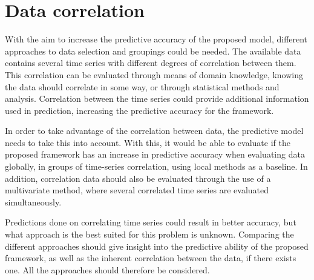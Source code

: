 \section{Data correlation}
\label{section:Architecture:ModelStructure}

With the aim to increase the predictive accuracy of the proposed model,
different approaches to data selection and groupings could be needed.
The available data contains several time series with different degrees of correlation between them.
This correlation can be evaluated through means of domain knowledge,
knowing the data should correlate in some way, or through statistical methods and analysis.
Correlation between the time series could provide additional information used in prediction,
increasing the predictive accuracy for the framework.


In order to take advantage of the correlation between data,
the predictive model needs to take this into account.
With this, it would be able to evaluate if the proposed framework has an increase in predictive accuracy
when evaluating data globally, in groups of time-series correlation, using local methods as a baseline.
In addition, correlation data should also be evaluated through the use of a multivariate method,
where several correlated time series are evaluated simultaneously.


Predictions done on correlating time series could result in better accuracy,
but what approach is the best suited for this problem is unknown.
Comparing the different approaches should give insight into the predictive ability of the proposed framework,
as well as the inherent correlation between the data, if there exists one.
All the approaches should therefore be considered.

